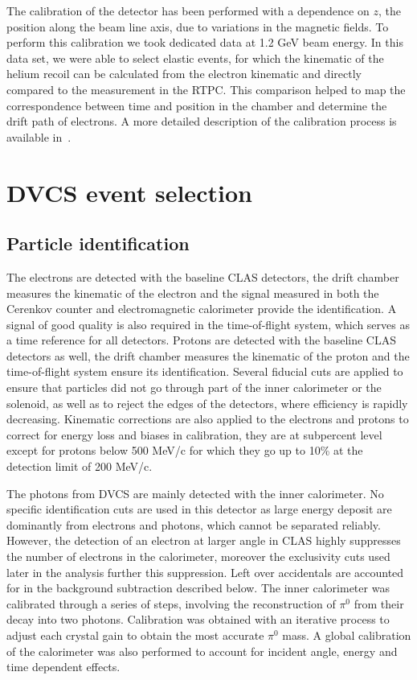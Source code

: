 \documentclass{article}
\begin{document}
The calibration of the detector has been performed with a 
dependence on $z$, the position along the beam line axis, due to 
variations in the magnetic fields. To perform this calibration we took  
dedicated data at 1.2 GeV beam energy. In 
this data set, we were able to select elastic events, for which the kinematic 
of the helium recoil can be calculated from the electron kinematic and 
directly compared to the measurement in the RTPC. This comparison helped to 
map the correspondence between time and position in the chamber and determine 
the drift path of electrons. A more detailed description of the calibration process 
is available in~\cite{Dupre:2017upj}.

\section{DVCS event selection}

\subsection{Particle identification}

The electrons are detected with the baseline CLAS detectors, the drift chamber measures the kinematic 
of the electron and the signal measured in both the Cerenkov counter and electromagnetic calorimeter
provide the identification. A signal of good quality is also required in the 
time-of-flight system, which serves as a time reference for all detectors. 
Protons are detected with the baseline CLAS detectors as well, the drift chamber measures the kinematic 
of the proton and the time-of-flight system ensure its identification.
Several 
fiducial cuts are applied to ensure that particles did not go through part of the inner calorimeter 
or the solenoid, as well as to reject the edges of the detectors, where efficiency is rapidly 
decreasing. Kinematic corrections are also applied to the electrons and protons to correct for energy loss
and biases in calibration, they are at subpercent level except for protons below 500 MeV/c for which they
go up to 10\% at the detection limit of 200 MeV/c.

The photons from DVCS are mainly detected with the inner calorimeter. No specific 
identification cuts are used in this detector as large energy deposit are dominantly 
from electrons and photons, which cannot be separated reliably. However, the detection 
of an electron at larger angle in CLAS highly suppresses the number of electrons 
in the calorimeter, moreover the exclusivity cuts used later in the analysis further 
this suppression. Left over accidentals are accounted for in the background subtraction 
described below. The inner calorimeter was calibrated through a series of steps, 
involving the reconstruction of $\pi^0$ from their decay into two photons. Calibration was obtained 
with an iterative process to adjust each crystal gain to obtain the most accurate $\pi^0$ mass. A
global calibration of the calorimeter was also performed to account for incident angle, energy and 
time dependent effects.
\end{document}
